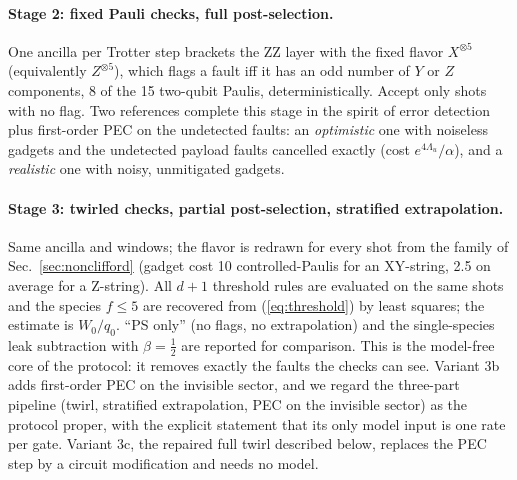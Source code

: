 \documentclass[11pt,a4paper]{article}
\theoremstyle{remark}
\begin{document}
\paragraph{Stage 2: fixed Pauli checks, full post-selection.} One ancilla per Trotter step brackets the ZZ layer with the fixed flavor $X^{\otimes5}$ (equivalently $Z^{\otimes5}$), which flags a fault iff it has an odd number of $Y$ or $Z$ components, 8 of the 15 two-qubit Paulis, deterministically. Accept only shots with no flag. Two references complete this stage in the spirit of error detection plus first-order PEC on the undetected faults: an \emph{optimistic} one with noiseless gadgets and the undetected payload faults cancelled exactly (cost $e^{4\Lambda_u}/\alpha$), and a \emph{realistic} one with noisy, unmitigated gadgets.

\paragraph{Stage 3: twirled checks, partial post-selection, stratified extrapolation.} Same ancilla and windows; the flavor is redrawn for every shot from the family of Sec.~\ref{sec:nonclifford} (gadget cost 10 controlled-Paulis for an XY-string, 2.5 on average for a Z-string). All $d+1$ threshold rules are evaluated on the same shots and the species $f\le5$ are recovered from (\ref{eq:threshold}) by least squares; the estimate is $W_0/q_0$. ``PS only'' (no flags, no extrapolation) and the single-species leak subtraction with $\beta=\tfrac12$ are reported for comparison. This is the model-free core of the protocol: it removes exactly the faults the checks can see. Variant 3b adds first-order PEC on the invisible sector, and we regard the three-part pipeline (twirl, stratified extrapolation, PEC on the invisible sector) as the protocol proper, with the explicit statement that its only model input is one rate per gate. Variant 3c, the repaired full twirl described below, replaces the PEC step by a circuit modification and needs no model.
\end{document}
